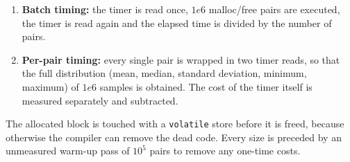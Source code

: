 \documentclass[a4paper,11pt]{article}
\begin{document}
\begin{enumerate}
    \item \textbf{Batch timing:} the timer is read once, $1e6$
    malloc/free pairs are executed, the timer is read again
    and the elapsed time is divided by the number of pairs.
    \item \textbf{Per-pair timing:} every single pair is wrapped in two timer
    reads, so that the full distribution (mean, median, standard deviation,
    minimum, maximum) of $1e6$ samples is obtained. The cost of the timer
    itself is measured separately and subtracted.
\end{enumerate}

The allocated block is touched with a \texttt{volatile} store before it is
freed, because otherwise the compiler can remove the dead code.
Every size is preceded by an unmeasured warm-up pass of $10^5$ pairs to remove any one-time costs.
\end{document}
